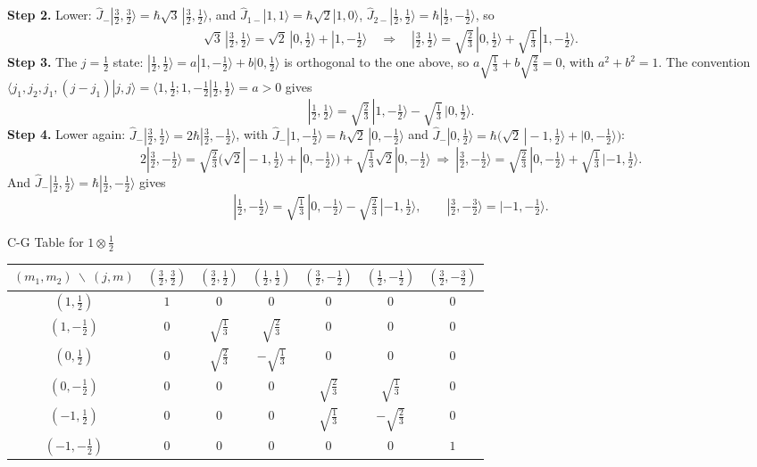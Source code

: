\documentclass[11pt,a4paper]{article}
\begin{document}
\textbf{Step 2.} Lower: $\hat J_-|\tfrac32,\tfrac32\rangle=\hbar\sqrt3\,|\tfrac32,\tfrac12\rangle$, and $\hat J_{1-}|1,1\rangle=\hbar\sqrt2|1,0\rangle$, $\hat J_{2-}|\tfrac12,\tfrac12\rangle=\hbar|\tfrac12,-\tfrac12\rangle$, so
\[
\sqrt3\,|\tfrac32,\tfrac12\rangle=\sqrt2\,|0,\tfrac12\rangle+|1,-\tfrac12\rangle\quad\Rightarrow\quad |\tfrac32,\tfrac12\rangle=\sqrt{\tfrac23}\,|0,\tfrac12\rangle+\sqrt{\tfrac13}\,|1,-\tfrac12\rangle .
\]
\textbf{Step 3.} The $j=\tfrac12$ state: $|\tfrac12,\tfrac12\rangle=a|1,-\tfrac12\rangle+b|0,\tfrac12\rangle$ is orthogonal to the one above, so $a\sqrt{\tfrac13}+b\sqrt{\tfrac23}=0$, with $a^2+b^2=1$. The convention $\langle j_1,j_2,j_1,(j-j_1)|j,j\rangle=\langle1,\tfrac12;1,-\tfrac12|\tfrac12,\tfrac12\rangle=a>0$ gives
\[
|\tfrac12,\tfrac12\rangle=\sqrt{\tfrac23}\,|1,-\tfrac12\rangle-\sqrt{\tfrac13}\,|0,\tfrac12\rangle .
\]
\textbf{Step 4.} Lower again: $\hat J_-|\tfrac32,\tfrac12\rangle=2\hbar|\tfrac32,-\tfrac12\rangle$, with $\hat J_-|1,-\tfrac12\rangle=\hbar\sqrt2\,|0,-\tfrac12\rangle$ and $\hat J_-|0,\tfrac12\rangle=\hbar\big(\sqrt2\,|-1,\tfrac12\rangle+|0,-\tfrac12\rangle\big)$:
\[
2|\tfrac32,-\tfrac12\rangle=\sqrt{\tfrac23}\big(\sqrt2|-1,\tfrac12\rangle+|0,-\tfrac12\rangle\big)+\sqrt{\tfrac13}\sqrt2|0,-\tfrac12\rangle\ \Rightarrow\ |\tfrac32,-\tfrac12\rangle=\sqrt{\tfrac23}\,|0,-\tfrac12\rangle+\sqrt{\tfrac13}\,|-1,\tfrac12\rangle .
\]
And $\hat J_-|\tfrac12,\tfrac12\rangle=\hbar|\tfrac12,-\tfrac12\rangle$ gives
\[
|\tfrac12,-\tfrac12\rangle=\sqrt{\tfrac13}\,|0,-\tfrac12\rangle-\sqrt{\tfrac23}\,|-1,\tfrac12\rangle,\qquad |\tfrac32,-\tfrac32\rangle=|-1,-\tfrac12\rangle .
\]

\begin{thm}{C-G Table for $1\otimes\tfrac12$}
\begin{center}
\renewcommand{\arraystretch}{1.5}
\begin{tabular}{c|cccccc}
$(m_1,m_2)\ \backslash\ (j,m)$ & $(\tfrac32,\tfrac32)$ & $(\tfrac32,\tfrac12)$ & $(\tfrac12,\tfrac12)$ & $(\tfrac32,-\tfrac12)$ & $(\tfrac12,-\tfrac12)$ & $(\tfrac32,-\tfrac32)$\\
\hline
$(1,\tfrac12)$ & $1$ & $0$ & $0$ & $0$ & $0$ & $0$\\
$(1,-\tfrac12)$ & $0$ & $\sqrt{\tfrac13}$ & $\sqrt{\tfrac23}$ & $0$ & $0$ & $0$\\
$(0,\tfrac12)$ & $0$ & $\sqrt{\tfrac23}$ & $-\sqrt{\tfrac13}$ & $0$ & $0$ & $0$\\
$(0,-\tfrac12)$ & $0$ & $0$ & $0$ & $\sqrt{\tfrac23}$ & $\sqrt{\tfrac13}$ & $0$\\
$(-1,\tfrac12)$ & $0$ & $0$ & $0$ & $\sqrt{\tfrac13}$ & $-\sqrt{\tfrac23}$ & $0$\\
$(-1,-\tfrac12)$ & $0$ & $0$ & $0$ & $0$ & $0$ & $1$
\end{tabular}
\end{center}
\end{thm}
\end{document}
